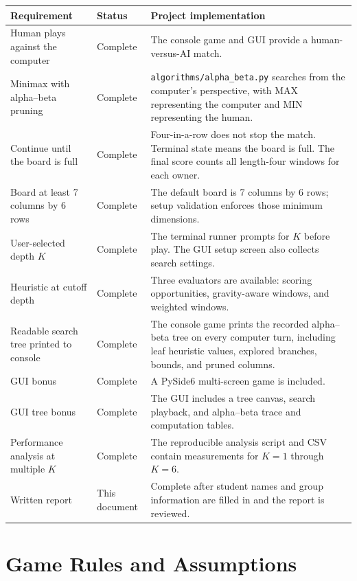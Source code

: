 \documentclass[11pt,a4paper]{article}
\begin{document}
\begin{longtable}{@{}>{\raggedright\arraybackslash}p{}@{\hspace{5pt}}>{\raggedright\arraybackslash}p{}@{\hspace{5pt}}>{\raggedright\arraybackslash}p{}@{}}
\toprule
\textbf{Requirement} & \textbf{Status} & \textbf{Project implementation}\\
\midrule
Human plays against the computer & Complete & The console game and GUI provide a human-versus-AI match.\\
Minimax with alpha--beta pruning & Complete & \texttt{algorithms/alpha\_beta.py} searches from the computer's perspective, with MAX representing the computer and MIN representing the human.\\
Continue until the board is full & Complete & Four-in-a-row does not stop the match. Terminal state means the board is full. The final score counts all length-four windows for each owner.\\
Board at least 7 columns by 6 rows & Complete & The default board is 7 columns by 6 rows; setup validation enforces those minimum dimensions.\\
User-selected depth $K$ & Complete & The terminal runner prompts for $K$ before play. The GUI setup screen also collects search settings.\\
Heuristic at cutoff depth & Complete & Three evaluators are available: scoring opportunities, gravity-aware windows, and weighted windows.\\
Readable search tree printed to console & Complete & The console game prints the recorded alpha--beta tree on every computer turn, including leaf heuristic values, explored branches, bounds, and pruned columns.\\
GUI bonus & Complete & A PySide6 multi-screen game is included.\\
GUI tree bonus & Complete & The GUI includes a tree canvas, search playback, and alpha--beta trace and computation tables.\\
Performance analysis at multiple $K$ & Complete & The reproducible analysis script and CSV contain measurements for $K=1$ through $K=6$.\\
Written report & This document & Complete after student names and group information are filled in and the report is reviewed.\\
\bottomrule
\end{longtable}

\section{Game Rules and Assumptions}
\end{document}
